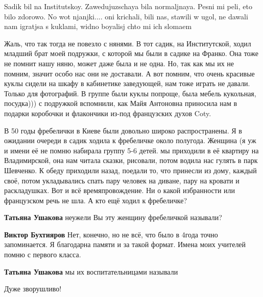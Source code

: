 \begin{itemize}

Sadik bil na Institutskoy. Zawedujuzschaya bila normaljnaya. Pesni mi peli, eto
bilo zdorowo. No wot njanjki.... oni krichali, bili nas, stawili w ugol, ne
dawali nam igratjsa s kuklami, widno boyalisj chto mi ich slomaem


Жаль, что так тогда не повезло с нянями. В тот садик, на Институтской, ходил
младший брат моей подружки, с которой мы были в садике на Франко. Она тоже не
помнит нашу няню, может даже была и не одна. Но, так как мы их не помним,
значит особо нас они не доставали. А вот помним, что очень красивые куклы
сидели на шкафу в кабинетике заведующей, нам тоже играть не давали. Только для
фотографий. В группе были куклы попроще, была мебель кукольная, посудка))) с
подружкой вспомнили, как Майя Антоновна приносила нам в подарки коробочки и
флакончики из-под французских духов Coty.


В 50 годы фребелички в Киеве были довольно широко распространены. Я в ожидании
очереди в садик ходила к фребеличке около полугода. Женщина (я уж и имени её не
помню набирала группу 5-6 детей. мы приходили в её квартиру на Владимирской,
она нам читала сказки, рисовали, потом водила нас гулять в парк Шевченко. К
обеду приходили назад, поедали то, что принесли из дому, каждый своё, потом
укладывались спать пару человек на диване, пару на кровати и раскладушках. Вот
и всё времяпровождение. Ни о какой избранности или французском речь не шла. А
кто ещё ходил к фребеличке?

\begin{itemize} %
\textbf{Татьяна Ушакова} неужели Вы эту женщину фребеличкой называли?

\textbf{Виктор Бухтияров} Нет, конечно, но не всё, что было в 4года точно запоминается. Я благодарна памяти и за такой формат. Имена моих учителей помню с первого класса.

\textbf{Татьяна Ушакова} мы их воспитательницами называли
\end{itemize} %

Дуже зворушливо!

\end{itemize} %
